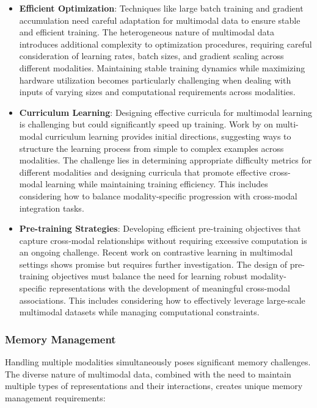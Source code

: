 \begin{itemize}
    \item \textbf{Efficient Optimization}: Techniques like large batch training \citep{you2020large} and gradient accumulation need careful adaptation for multimodal data to ensure stable and efficient training. The heterogeneous nature of multimodal data introduces additional complexity to optimization procedures, requiring careful consideration of learning rates, batch sizes, and gradient scaling across different modalities. Maintaining stable training dynamics while maximizing hardware utilization becomes particularly challenging when dealing with inputs of varying sizes and computational requirements across modalities.
    
    \item \textbf{Curriculum Learning}: Designing effective curricula for multimodal learning is challenging but could significantly speed up training. Work by \citet{wang2021multi} on multi-modal curriculum learning provides initial directions, suggesting ways to structure the learning process from simple to complex examples across modalities. The challenge lies in determining appropriate difficulty metrics for different modalities and designing curricula that promote effective cross-modal learning while maintaining training efficiency. This includes considering how to balance modality-specific progression with cross-modal integration tasks.
    
    \item \textbf{Pre-training Strategies}: Developing efficient pre-training objectives that capture cross-modal relationships without requiring excessive computation is an ongoing challenge. Recent work on contrastive learning in multimodal settings \citep{jia2021scaling} shows promise but requires further investigation. The design of pre-training objectives must balance the need for learning robust modality-specific representations with the development of meaningful cross-modal associations. This includes considering how to effectively leverage large-scale multimodal datasets while managing computational constraints.
\end{itemize}

\subsubsection{Memory Management}
Handling multiple modalities simultaneously poses significant memory challenges. The diverse nature of multimodal data, combined with the need to maintain multiple types of representations and their interactions, creates unique memory management requirements:

